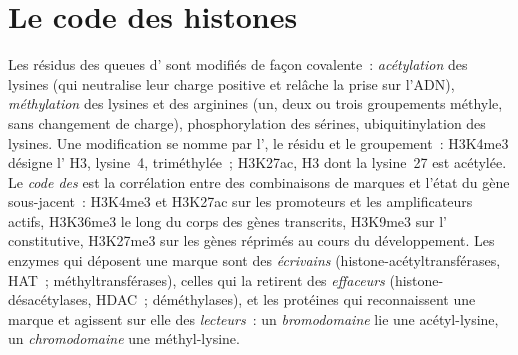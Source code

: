 \section{Le code des histones}

\begin{definition}\label{def:b3:chromatin-epigenetics:histone-code}
Les résidus des queues d' sont modifiés de façon covalente~:
\emph{acétylation} des lysines (qui neutralise leur charge positive et
relâche la prise sur l'ADN), \emph{méthylation} des lysines et des
arginines (un, deux ou trois groupements méthyle, sans changement de
charge), phosphorylation des sérines, ubiquitinylation des lysines. Une
modification se nomme par l', le résidu et le groupement~:
H3K4me3 désigne l' H3, lysine~4, triméthylée~; H3K27ac, H3 dont
la lysine~27 est acétylée. Le \emph{code des } est la
corrélation entre des combinaisons de marques et l'état du gène
sous-jacent~: H3K4me3 et H3K27ac sur les promoteurs et les amplificateurs
actifs, H3K36me3 le long du corps des gènes transcrits, H3K9me3 sur
l' constitutive, H3K27me3 sur les gènes réprimés au
cours du développement. Les enzymes qui déposent une marque sont des
\emph{écrivains} (histone-acétyltransférases, HAT~; méthyltransférases),
celles qui la retirent des \emph{effaceurs} (histone-désacétylases,
HDAC~; déméthylases), et les protéines qui reconnaissent une marque et
agissent sur elle des \emph{lecteurs}~: un \emph{bromodomaine} lie une
acétyl-lysine, un \emph{chromodomaine} une méthyl-lysine.
\end{definition}

